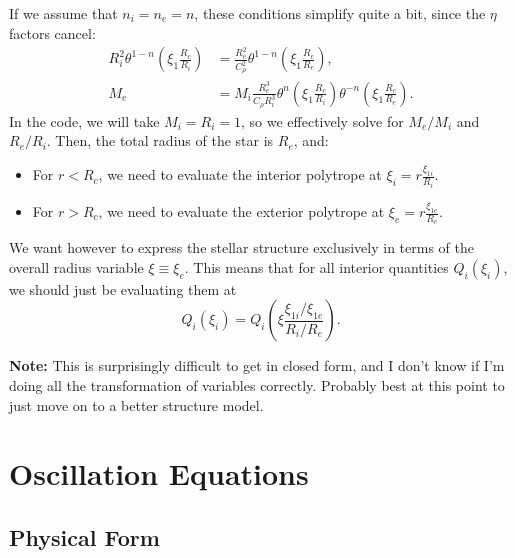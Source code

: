 \documentclass[11pt,
        usenames, %
        twocolumn,
        landscape,
        dvipsnames %
    ]{article}
\newcommand*{\p}[1]{\left(#1\right)}
\begin{document}
If we assume that $n_i = n_e = n$, these conditions simplify quite a bit, since the
$\eta$ factors cancel:
\begin{align}
    R_i^2 \theta^{1 - n}\p{\xi_1\frac{R_c}{R_i}}
        &= \frac{R_e^2}{C_\rho^2}
            \theta^{1 - n}\p{\xi_1\frac{R_c}{R_e}},\\
    M_e &= M_i\frac{R_e^3}{C_\rho R_i^3}
        \theta^{n}\p{\xi_1\frac{R_c}{R_i}}
        \theta^{-n}\p{\xi_1\frac{R_c}{R_e}}.
\end{align}
In the code, we will take $M_i = R_i = 1$, so we effectively solve for $M_e /
M_i$ and $R_e / R_i$. Then, the total radius of the star is $R_e$, and:
\begin{itemize}
    \item For $r < R_c$, we need to evaluate the interior polytrope at $\xi_i =
        r\frac{\xi_{1i}}{R_i}$.
    \item For $r > R_c$, we need to evaluate the exterior polytrope at $\xi_e =
        r\frac{\xi_{1e}}{R_e}$.
\end{itemize}
We want however to express the stellar structure exclusively in terms of the
overall radius variable $\xi \equiv \xi_e$. This means that for all
interior quantities $Q_i(\xi_i)$, we should just be evaluating them at
\begin{equation}
    Q_i(\xi_i) = Q_i\p{\xi\frac{\xi_{1i} / \xi_{1e}}{R_i / R_e}}.
\end{equation}

\textbf{Note:} This is surprisingly difficult to get in closed form, and I
don't know if I'm doing all the transformation of variables correctly. Probably
best at this point to just move on to a better structure model.

\section{Oscillation Equations}

\subsection{Physical Form}
\end{document}
